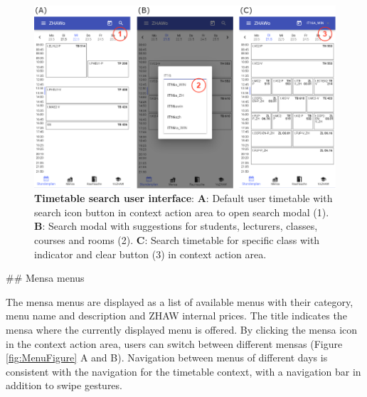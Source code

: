 \begin{markdown}
\begin{figure}[H]
  \includegraphics[width=16cm, center]{./figures/timetable_figure2.png}
  \captionsetup{width=15.5cm}
  \caption[Timetable search user interface]{\textbf{Timetable search user interface}: \textbf{A}: Default user timetable with search icon button in context action area to open search modal (1). \textbf{B}: Search modal with suggestions for students, lecturers, classes, courses and rooms (2). \textbf{C}: Search timetable for specific class with indicator and clear button (3) in context action area.}
  \label{fig:TimetableFigure2}
\end{figure}

\newpage

## Mensa menus

The mensa menus are displayed as a list of available menus with their category, menu name and description and ZHAW internal prices. The title indicates the mensa where the currently displayed menu is offered. By clicking the mensa icon in the context action area, users can switch between different mensas (Figure \ref{fig:MenuFigure} A and B). Navigation between menus of different days is consistent with the navigation for the timetable context, with a navigation bar in addition to swipe gestures.

\bigskip


\end{markdown}
